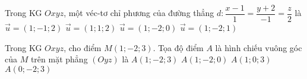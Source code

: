 \begin{ex}%
	Trong KG $Oxyz$, một véc-tơ chỉ phương của đường thẳng $d\colon \dfrac{x-1}{1}=\dfrac{y+2}{-1}=\dfrac{z}{2}$ là
	\choice
	{\True $\overrightarrow{u}=(1;-1;2)$}
	{$\overrightarrow{u}=(1;1;2)$}
	{$\overrightarrow{u}=(1;-2;0)$}
	{$\overrightarrow{u}=(1;-2;1)$}
\end{ex}

\begin{ex}%
	Trong KG $Oxyz$, cho điểm $M(1;-2;3)$. Tọa độ điểm $A$ là hình chiếu vuông góc của $M$ trên mặt phẳng $(Oyz)$ là
	\choice
	{$A(1;-2;3)$}
	{$A(1;-2;0)$}
	{$A(1;0;3)$}
	{\True $A(0;-2;3)$}
\end{ex}

